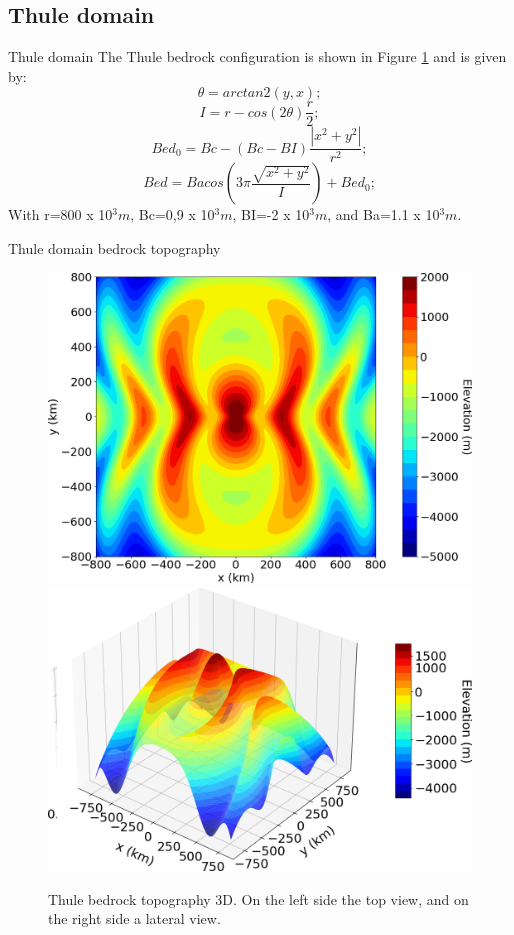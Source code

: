 \documentclass[11pt]{beamer}
\begin{document}
	\subsection{Thule domain}
		\begin{frame}{Thule domain}
			The Thule bedrock configuration is shown in Figure \ref{Thule_3D} and is given by:
			\begin{equation}
				\theta=arctan2(y,x);
			\end{equation}
			\begin{equation}
				I=r-cos(2\theta)\frac{r}{2};
			\end{equation}
			\begin{equation}
				Bed_0=Bc-(Bc-BI)\frac{|x^2+y^2|}{r^2};
			\end{equation}
			\begin{equation}
				Bed=Bacos(3\pi\frac{\sqrt{x^2+y^2}}{I})+Bed_0;
			\end{equation}
			With r=800 x 10$^3 m$, Bc=0,9 x 10$^3 m$, BI=-2 x 10$^3 m$, and Ba=1.1 x 10$^3 m$.
		\end{frame}
			\begin{frame}{Thule domain bedrock topography}
			\begin{figure}
				\centering
				\includegraphics[width=0.45\linewidth]{../fig/Thule_2D}
				\includegraphics[width=0.45\linewidth]{../fig/Thule_3D}
				\caption{Thule bedrock topography 3D. On the left side the top view, and on the right side a lateral view.}
				\label{Thule_3D}
			\end{figure}
			\end{frame}
\end{document}
